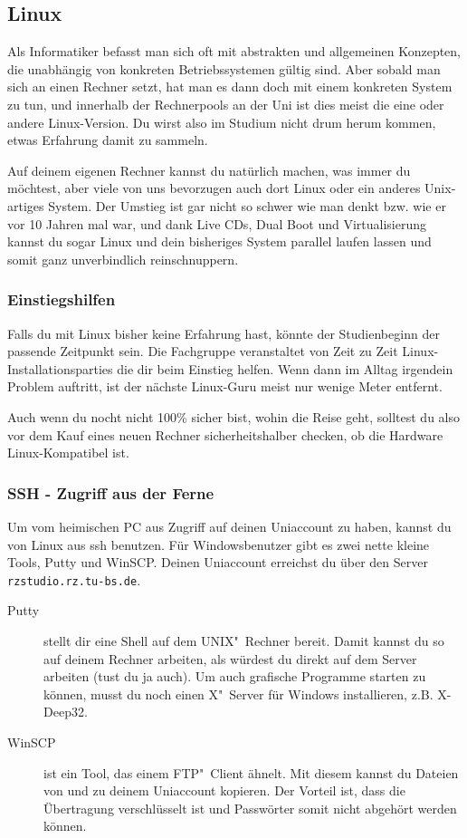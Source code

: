 \begin{multicols}{2}
\subsection{Linux}
	\label{linux}
	Als Informatiker befasst man sich oft mit abstrakten und allgemeinen Konzepten, die unabhängig von konkreten Betriebssystemen gültig sind. Aber sobald man sich an einen Rechner setzt, hat man es dann doch mit einem konkreten System zu tun, und innerhalb der Rechnerpools an der Uni ist dies meist die eine oder andere Linux-Version. Du wirst also im Studium nicht drum herum kommen, etwas Erfahrung damit zu sammeln.

	Auf deinem eigenen Rechner kannst du natürlich machen, was immer du möchtest, aber viele von uns bevorzugen auch dort Linux oder ein anderes Unix-artiges System. Der Umstieg ist gar nicht so schwer wie man denkt bzw. wie er vor 10 Jahren mal war, und dank Live CDs, Dual Boot und Virtualisierung kannst du sogar Linux und dein bisheriges System parallel laufen lassen und somit ganz unverbindlich reinschnuppern.

	\subsubsection{Einstiegshilfen}
		Falls du mit Linux bisher keine Erfahrung hast, könnte der Studienbeginn der passende Zeitpunkt sein. Die Fachgruppe veranstaltet von Zeit zu Zeit Linux-Installationsparties die dir beim Einstieg helfen. Wenn dann im Alltag irgendein Problem auftritt, ist der nächste Linux-Guru meist nur wenige Meter entfernt.

		Auch wenn du nocht nicht 100\% sicher bist, wohin die Reise geht, solltest du also vor dem Kauf eines neuen Rechner sicherheitshalber checken, ob die Hardware Linux-Kompatibel ist.

	\subsubsection{SSH - Zugriff aus der Ferne}
		Um vom heimischen PC aus Zugriff auf deinen Uniaccount zu haben, kannst du von Linux aus ssh benutzen. Für Windowsbenutzer gibt es zwei nette kleine Tools, Putty und WinSCP. Deinen Uniaccount erreichst du über den Server \texttt{rzstudio.rz.tu-bs.de}.

		\begin{description}
			\item[Putty] stellt dir eine Shell auf dem UNIX"~Rechner bereit. Damit kannst du so auf deinem Rechner arbeiten, als würdest du direkt auf dem Server arbeiten (tust du ja auch). Um auch grafische Programme starten zu können, musst du noch einen X"~Server für Windows installieren, z.B. X-Deep32.
			\item[WinSCP] ist ein Tool, das einem FTP"~Client ähnelt. Mit diesem kannst du Dateien von und zu deinem Uniaccount kopieren. Der Vorteil ist, dass die Übertragung verschlüsselt ist und Passwörter somit nicht abgehört werden können.
		\end{description}


\end{multicols}
